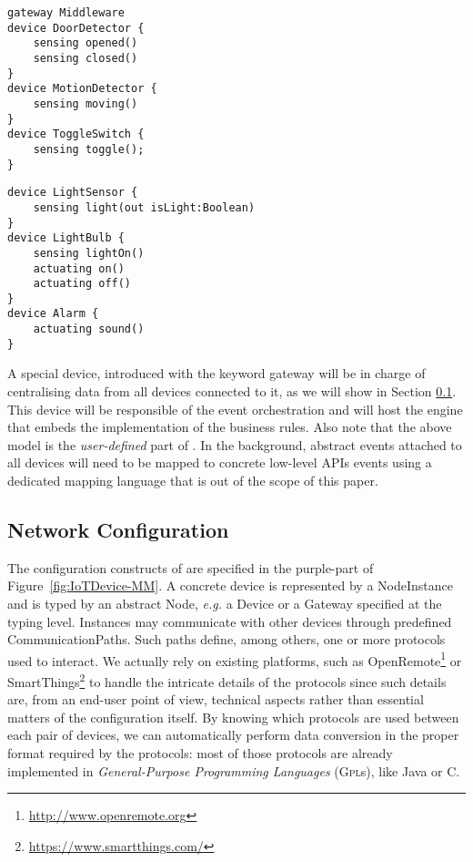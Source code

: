 \begin{table}
	\begin{minipage}[b]{.45\textwidth }%
		\begin{lstlisting}[language=iotdsl]	
gateway Middleware
device DoorDetector {
	sensing opened()
	sensing closed()
}
device MotionDetector {
	sensing moving()
}
device ToggleSwitch {
	sensing toggle();
}
		\end{lstlisting}
	\end{minipage}\hfill%
	\begin{minipage}[b]{.45\textwidth}
		\begin{lstlisting}[language=iotdsl, firstnumber=12]
device LightSensor {
	sensing light(out isLight:Boolean)
}
device LightBulb {
	sensing lightOn()
	actuating on()
	actuating off()
}	
device Alarm {
	actuating sound()
}
    \end{lstlisting}
	\end{minipage}
\label{lis:RE-TypeDeclarations}
\end{table}

A special device, introduced with the keyword \textsf{gateway} will be in charge of centralising data from all devices connected to it, as we will show in Section \ref{sec:IoTDSL-NetworkConfiguration}. This device will be responsible of the event orchestration and will host the \CEP engine that embeds the implementation of the business rules. Also note that the above model is the \textit{user-defined} part of \IOTDSL. In the background, abstract events attached to all devices will need to be mapped to concrete low-level APIs events using a dedicated mapping language that is out of the scope of this paper.

\subsection{Network Configuration}
\label{sec:IoTDSL-NetworkConfiguration}

The configuration constructs of \IOTDSL are specified in the purple-part of Figure~\ref{fig:IoTDevice-MM}. A concrete device is represented by a \textsf{NodeInstance} and is typed by an abstract \textsf{Node}, \textit{e.g.} a \textsf{Device} or a \textsf{Gateway} specified at the typing level. Instances may communicate with other \IOT devices through predefined \textsf{CommunicationPath}s. Such paths define, among others, one or more protocols used to interact. We actually rely on existing platforms, such as OpenRemote\footnote{\url{http://www.openremote.org}} or SmartThings\footnote{\url{https://www.smartthings.com/}} to handle the intricate details of the protocols since such details are, from an end-user point of view, technical aspects rather than essential matters of the configuration itself. By knowing which protocols are used between each pair of devices, we can automatically perform data conversion in the proper format required by the protocols: most of those protocols are already implemented in \textit{General-Purpose Programming Languages} (\textsc{Gpl}s), like Java or C.

